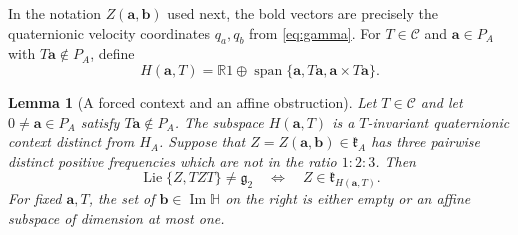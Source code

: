 \documentclass[11pt,a4paper]{article}
\newtheorem{lemma}[lemma]{Lemma}
\newcommand{\RR}{\mathbb R}
\newcommand{\HH}{\mathbb H}
\newcommand{\Lie}{\operatorname{Lie}}
\newcommand{\Span}{\operatorname{span}}
\begin{document}
In the notation $Z(\mathbf a,\mathbf b)$ used next, the bold vectors are precisely the quaternionic velocity coordinates $q_a,q_b$ from \eqref{eq:gamma}.
For $T\in\mathscr C$ and $\mathbf a\in P_A$ with $T\mathbf a\notin P_A$, define
\[
H(\mathbf a,T)=\RR1\oplus\Span\{\mathbf a,T\mathbf a,\mathbf a\times T\mathbf a\}.
\]

\begin{lemma}[A forced context and an affine obstruction]
\label{lem:universal-affine}
Let $T\in\mathscr C$ and let $0\ne \mathbf a\in P_A$ satisfy $T\mathbf a\notin P_A$.  The subspace $H(\mathbf a,T)$ is a $T$-invariant quaternionic context distinct from $H_A$.  Suppose that $Z=Z(\mathbf a,\mathbf b)\in\mathfrak k_A$ has three pairwise distinct positive frequencies which are not in the ratio $1:2:3$.  Then
\[
\Lie\{Z,TZT\}\ne\mathfrak g_2
\quad\Longleftrightarrow\quad Z\in\mathfrak k_{H(\mathbf a,T)}.
\]
For fixed $\mathbf a,T$, the set of $\mathbf b\in\operatorname{Im}\HH$ on the right is either empty or an affine subspace of dimension at most one.
\end{lemma}
\end{document}
